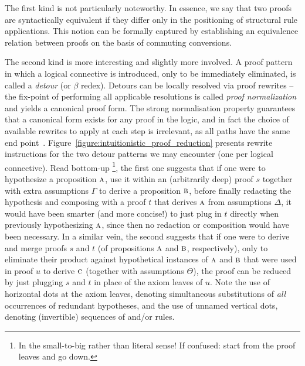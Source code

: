 The first kind is not particularly noteworthy.
In essence, we say that two proofs are syntactically equivalent if they differ only in the positioning of structural rule applications.
This notion can be formally captured by establishing an equivalence relation between proofs on the basis of commuting conversions.

The second kind is more interesting and slightly more involved.
A proof pattern in which a logical connective is introduced, only to be immediately eliminated, is called a \textit{detour} (or $\beta$ redex).
Detours can be locally resolved via proof rewrites -- the fix-point of performing all applicable resolutions is called \textit{proof normalization} and yields a canonical proof form. 
The strong normalisation property guarantees that a canonical form exists for any proof in the logic, and in fact the choice of available rewrites to apply at each step is irrelevant, as all paths have the same end point~\cite{groote1999strong}.
Figure~\ref{figure:intuitionistic_proof_reduction} presents rewrite instructions for the two detour patterns we may encounter (one per logical connective).
Read bottom-up%
\footnote{In the small-to-big rather than literal sense! If confused: start from the proof leaves and go down.},
the first one suggests that if one were to hypothesize a proposition $\normalfont\textsc{a}$, use it within an (arbitrarily deep) proof $s$ together with extra assumptions $\Gamma$ to derive a proposition $\normalfont\textsc{b}$, before finally redacting the hypothesis and composing with a proof $t$ that derives $\normalfont\textsc{a}$ from assumptions $\Delta$, it would have been smarter (and more concise!) to just plug in $t$ directly when previously hypothesizing $\normalfont\textsc{a}$, since then no redaction or composition would have been necessary.
In a similar vein, the second suggests that if one were to derive and merge proofs $s$ and $t$ (of propositions $\normalfont\textsc{a}$ and $\normalfont\textsc{b}$, respectively), only to eliminate their product against hypothetical instances of $\normalfont\textsc{a}$ and $\normalfont\textsc{b}$ that were used in proof $u$ to derive $\normalfont\textsc{c}$ (together with assumptions $\Theta$), the proof can be reduced by just plugging $s$ and $t$ in place of the axiom leaves of $u$.
Note the use of horizontal dots at the axiom leaves, denoting simultaneous substitutions of \textit{all} occurrences of redundant hypotheses, and the use of unnamed vertical dots, denoting (invertible) sequences of \Contraction{} and/or \Exchange{} rules.

